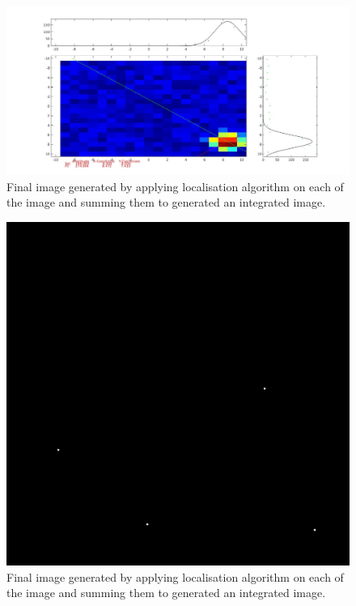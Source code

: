 \documentclass[paper=a4, fontsize=11pt]{scrartcl}
\numberwithin{equation}{section}		%
\numberwithin{figure}{section}			%
\numberwithin{table}{section}				%
\begin{document}
\begin{figure}[h]
\centering
\includegraphics[width=.5\textwidth]{result4}
\caption{Final image generated by applying localisation algorithm on each of the image and summing them to generated an integrated image. }
\end{figure}

\begin{figure}[h]
\centering
\includegraphics[width=.5\textwidth]{final_result.jpg}
\caption{Final image generated by applying localisation algorithm on each of the image and summing them to generated an integrated image. }
\end{figure}




\end{document}
